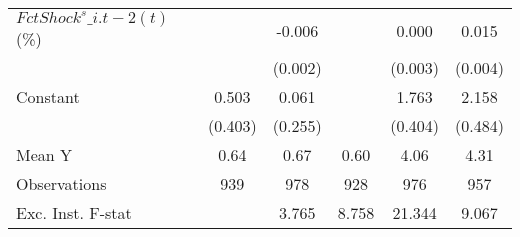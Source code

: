 {\begin{tabular}{l*{5}{c}}
\addlinespace
$ FctShock^s\_{i.t-2}(t)$ (\%)&                     &      -0.006\sym{**} &                     &       0.000         &       0.015\sym{***}\\
                    &                     &     (0.002)         &                     &     (0.003)         &     (0.004)         \\
\addlinespace
Constant            &       0.503         &       0.061         &                     &       1.763\sym{***}&       2.158\sym{***}\\
                    &     (0.403)         &     (0.255)         &                     &     (0.404)         &     (0.484)         \\
\midrule
Mean Y              &        0.64         &        0.67         &        0.60         &        4.06         &        4.31         \\
Observations        &         939         &         978         &         928         &         976         &         957         \\
Exc. Inst. F-stat   &                     &       3.765         &       8.758         &      21.344         &       9.067         \\
\bottomrule
\end{tabular}
}
